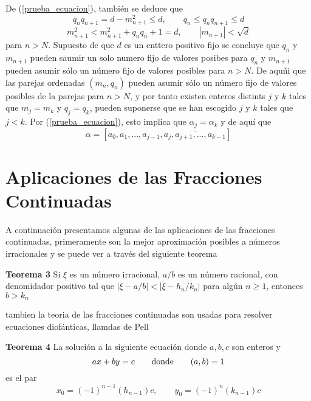 \documentclass[11pt, article]{article}
\begin{document}
    De (\ref{prueba_ecuacion}), también se deduce que 
        \[
        q_nq_{n+1}=d-m^2_{n+1}\leq d, \qquad q_n\leq q_nq_{n+1}\leq d 
        \]
        \[
        m^2_{n+1} < m_{n+1}^2+q_n q_n+1=d, \qquad |m_{n+1}|<\sqrt{d}
        \]
    para $n>N$. Supuesto de que $d$ es un enttero positivo fijo se concluye que $q_n$ y $m_{n+1}$ pueden saumir un solo numero fijo de valores posibes para $q_n$ y $m_{n+1}$ pueden asumir sólo un número fijo de valores posibles para $n>N$. De aquñi que las parejas ordenadas $(m_n,q_n)$ pueden asumir sólo un número fijo de valores posibles de la parejas para $n>N$, y por tanto existen enteros distints $j$ y $k$ tales que $m_j=m_k$ y $q_j=q_k$, pueden suponerse que se han escogido $j$ y $k$ tales que $j<k$. Por (\ref{prueba_ecuacion}), esto implica que $\alpha_j=\alpha_k$ y de aquí que
        \[
        \alpha=[a_0,a_1,...,a_{j-1},\overline{a_j,a_{j+1},...,a_{k-1}}]
        \]
    
    \section*{Aplicaciones de las Fracciones Continuadas}
     A continuación presentamos algunas de las aplicaciones de las fracciones continuadas, primeramente son la mejor aproximación posibles a números irracionales y se puede ver a través del siguiente teorema
     
     \textbf{Teorema 3} Si $\xi$ es un número irracional, $a/b$ es un número racional, con denomidador positivo tal que $|\xi - a/b|<|\xi-h_n/k_n|$ para algún $n\geq 1$, entonces $b>k_n$
     
     tambien la teoria de las fracciones continuadas son usadas para resolver ecuaciones diofánticas, llamdas de Pell
     
    \textbf{Teorema 4} La solución a la siguiente ecuación donde $a,b,c$ son enteros y 
     \[
     ax+by=c \qquad \textnormal{donde} \qquad (a,b)=1
     \] 
     es el par
     \[
     x_0 = (-1)^{n-1} (h_{n-1})c, \qquad y_0=(-1)^n (k_{n-1})c
     \]
     
\end{document}
